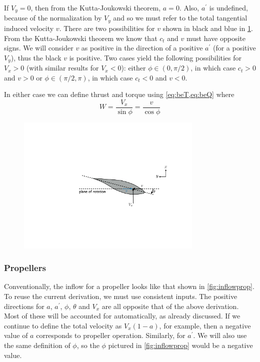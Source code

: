 \documentclass{article}
\begin{document}

If $V_y = 0$, then from the Kutta-Joukowski theorem, $a = 0$.  Also, $a^\prime$ is undefined, because of the normalization by $V_y$ and so we must refer to the total tangential induced velocity $v$.  There are two possibilities for $v$ shown in black and blue in \cref{fig:inflowv}.  From the Kutta-Joukowski theorem we know that $c_t$ and $v$ must have opposite signs.  We will consider $v$ as positive in the direction of a positive $a^\prime$ (for a positive $V_y$), thus the black $v$ is positive.  Two cases yield the following possibilities for $V_x > 0$ (with similar results for $V_x < 0$): either $\phi \in (0, \pi/2)$, in which case $c_t > 0$ and $v > 0$ or $\phi \in (\pi/2, \pi)$, in which case $c_t < 0$ and $v < 0$.

In either case we can define thrust and torque using \cref{eq:beT,eq:beQ} where
\begin{equation}
    W = \frac{V_x}{\sin\phi} = \frac{v}{\cos\phi}
\end{equation}


\begin{figure}[htbp]
\centering
\includegraphics[width=3.5in]{figures/inflow5}
\caption{}
\label{fig:inflowv}
\end{figure}

\subsubsection{Propellers}

Conventionally, the inflow for a propeller looks like that shown in \cref{fig:inflowprop}.  To reuse the current derivation, we must use consistent inputs.  The positive directions for $a$, $a^\prime$, $\phi$, $\theta$ and $V_x$ are all opposite that of the above derivation.  Most of these will be accounted for automatically, as already discussed.  If we continue to define the total velocity as $V_x (1 - a)$, for example, then a negative value of $a$ corresponds to propeller operation.  Similarly, for $a^\prime$.  We will also use the same definition of $\phi$, so the $\phi$ pictured in \cref{fig:inflowprop} would be a negative value.
\end{document}
